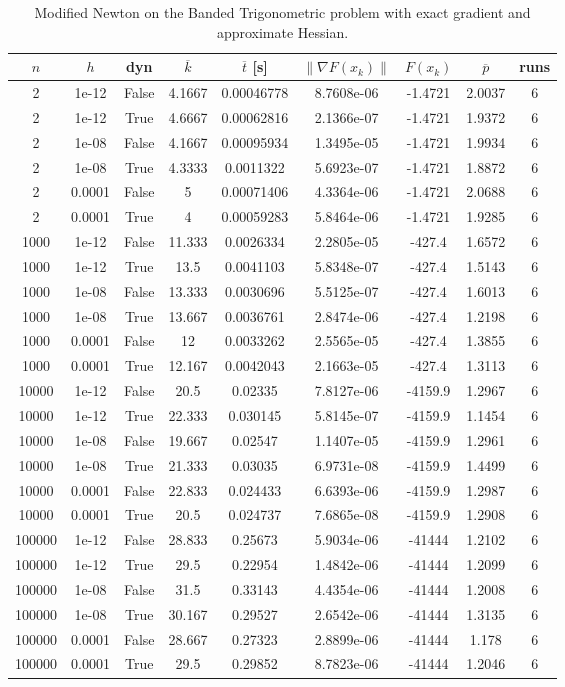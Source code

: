 \begin{table}
\caption{Modified Newton on the Banded Trigonometric problem with exact gradient and approximate Hessian.}
\label{tab:mn_trig_ex_grad}
\begin{tabular}{ccccccccc}
\toprule
$n$ & $h$ & dyn & $\overline{k}$ & $\overline{t}$ [s] & $\|\nabla F(x_k)\|$ & $F(x_k)$ & $\overline{p}$ & runs \\
\midrule
2 & 1e-12 & False & 4.1667 & 0.00046778 & 8.7608e-06 & -1.4721 & 2.0037 & 6 \\
2 & 1e-12 & True & 4.6667 & 0.00062816 & 2.1366e-07 & -1.4721 & 1.9372 & 6 \\
2 & 1e-08 & False & 4.1667 & 0.00095934 & 1.3495e-05 & -1.4721 & 1.9934 & 6 \\
2 & 1e-08 & True & 4.3333 & 0.0011322 & 5.6923e-07 & -1.4721 & 1.8872 & 6 \\
2 & 0.0001 & False & 5 & 0.00071406 & 4.3364e-06 & -1.4721 & 2.0688 & 6 \\
2 & 0.0001 & True & 4 & 0.00059283 & 5.8464e-06 & -1.4721 & 1.9285 & 6 \\
1000 & 1e-12 & False & 11.333 & 0.0026334 & 2.2805e-05 & -427.4 & 1.6572 & 6 \\
1000 & 1e-12 & True & 13.5 & 0.0041103 & 5.8348e-07 & -427.4 & 1.5143 & 6 \\
1000 & 1e-08 & False & 13.333 & 0.0030696 & 5.5125e-07 & -427.4 & 1.6013 & 6 \\
1000 & 1e-08 & True & 13.667 & 0.0036761 & 2.8474e-06 & -427.4 & 1.2198 & 6 \\
1000 & 0.0001 & False & 12 & 0.0033262 & 2.5565e-05 & -427.4 & 1.3855 & 6 \\
1000 & 0.0001 & True & 12.167 & 0.0042043 & 2.1663e-05 & -427.4 & 1.3113 & 6 \\
10000 & 1e-12 & False & 20.5 & 0.02335 & 7.8127e-06 & -4159.9 & 1.2967 & 6 \\
10000 & 1e-12 & True & 22.333 & 0.030145 & 5.8145e-07 & -4159.9 & 1.1454 & 6 \\
10000 & 1e-08 & False & 19.667 & 0.02547 & 1.1407e-05 & -4159.9 & 1.2961 & 6 \\
10000 & 1e-08 & True & 21.333 & 0.03035 & 6.9731e-08 & -4159.9 & 1.4499 & 6 \\
10000 & 0.0001 & False & 22.833 & 0.024433 & 6.6393e-06 & -4159.9 & 1.2987 & 6 \\
10000 & 0.0001 & True & 20.5 & 0.024737 & 7.6865e-08 & -4159.9 & 1.2908 & 6 \\
100000 & 1e-12 & False & 28.833 & 0.25673 & 5.9034e-06 & -41444 & 1.2102 & 6 \\
100000 & 1e-12 & True & 29.5 & 0.22954 & 1.4842e-06 & -41444 & 1.2099 & 6 \\
100000 & 1e-08 & False & 31.5 & 0.33143 & 4.4354e-06 & -41444 & 1.2008 & 6 \\
100000 & 1e-08 & True & 30.167 & 0.29527 & 2.6542e-06 & -41444 & 1.3135 & 6 \\
100000 & 0.0001 & False & 28.667 & 0.27323 & 2.8899e-06 & -41444 & 1.178 & 6 \\
100000 & 0.0001 & True & 29.5 & 0.29852 & 8.7823e-06 & -41444 & 1.2046 & 6 \\
\bottomrule
\end{tabular}
\end{table}
